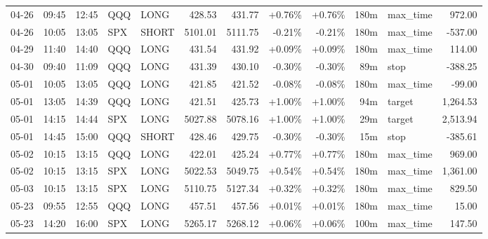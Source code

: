\documentclass[11pt,a4paper,twoside]{article}
\begin{document}
\begin{center}
\begin{longtable}{>{\color{txtmain}}l l l l l r r r r r >{\color{txtmain}}l r}
04-26 & 09:45 & 12:45 & QQQ & LONG & 428.53 & 431.77 & \textcolor{wingreen}{+0.76\%} & \textcolor{wingreen}{+0.76\%} & 180m & max\_time & \textcolor{wingreen}{972.00} \\
04-26 & 10:05 & 13:05 & SPX & SHORT & 5101.01 & 5111.75 & \textcolor{lossred}{-0.21\%} & \textcolor{lossred}{-0.21\%} & 180m & max\_time & \textcolor{lossred}{-537.00} \\
04-29 & 11:40 & 14:40 & QQQ & LONG & 431.54 & 431.92 & \textcolor{wingreen}{+0.09\%} & \textcolor{wingreen}{+0.09\%} & 180m & max\_time & \textcolor{wingreen}{114.00} \\
04-30 & 09:40 & 11:09 & QQQ & LONG & 431.39 & 430.10 & \textcolor{lossred}{-0.30\%} & \textcolor{lossred}{-0.30\%} & 89m & stop & \textcolor{lossred}{-388.25} \\
05-01 & 10:05 & 13:05 & QQQ & LONG & 421.85 & 421.52 & \textcolor{lossred}{-0.08\%} & \textcolor{lossred}{-0.08\%} & 180m & max\_time & \textcolor{lossred}{-99.00} \\
05-01 & 13:05 & 14:39 & QQQ & LONG & 421.51 & 425.73 & \textcolor{wingreen}{+1.00\%} & \textcolor{wingreen}{+1.00\%} & 94m & target & \textcolor{wingreen}{1,264.53} \\
05-01 & 14:15 & 14:44 & SPX & LONG & 5027.88 & 5078.16 & \textcolor{wingreen}{+1.00\%} & \textcolor{wingreen}{+1.00\%} & 29m & target & \textcolor{wingreen}{2,513.94} \\
05-01 & 14:45 & 15:00 & QQQ & SHORT & 428.46 & 429.75 & \textcolor{lossred}{-0.30\%} & \textcolor{lossred}{-0.30\%} & 15m & stop & \textcolor{lossred}{-385.61} \\
05-02 & 10:15 & 13:15 & QQQ & LONG & 422.01 & 425.24 & \textcolor{wingreen}{+0.77\%} & \textcolor{wingreen}{+0.77\%} & 180m & max\_time & \textcolor{wingreen}{969.00} \\
05-02 & 10:15 & 13:15 & SPX & LONG & 5022.53 & 5049.75 & \textcolor{wingreen}{+0.54\%} & \textcolor{wingreen}{+0.54\%} & 180m & max\_time & \textcolor{wingreen}{1,361.00} \\
05-03 & 10:15 & 13:15 & SPX & LONG & 5110.75 & 5127.34 & \textcolor{wingreen}{+0.32\%} & \textcolor{wingreen}{+0.32\%} & 180m & max\_time & \textcolor{wingreen}{829.50} \\
05-23 & 09:55 & 12:55 & QQQ & LONG & 457.51 & 457.56 & \textcolor{wingreen}{+0.01\%} & \textcolor{wingreen}{+0.01\%} & 180m & max\_time & \textcolor{wingreen}{15.00} \\
05-23 & 14:20 & 16:00 & SPX & LONG & 5265.17 & 5268.12 & \textcolor{wingreen}{+0.06\%} & \textcolor{wingreen}{+0.06\%} & 100m & max\_time & \textcolor{wingreen}{147.50} \\

\end{longtable}
\end{center}
\end{document}
